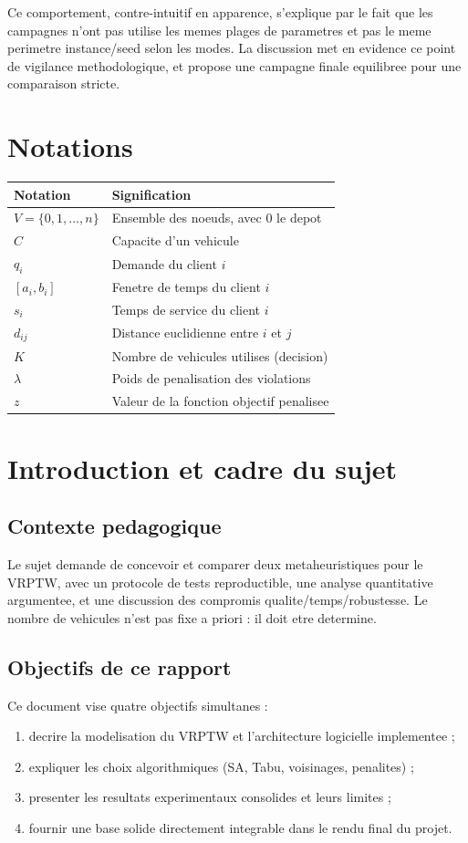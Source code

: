 \documentclass[12pt,a4paper]{report}
\begin{document}
Ce comportement, contre-intuitif en apparence, s'explique par le fait que
les campagnes n'ont pas utilise les memes plages de parametres et pas le meme perimetre
instance/seed selon les modes. La discussion met en evidence ce point de vigilance methodologique,
et propose une campagne finale equilibree pour une comparaison stricte.

\chapter*{Notations}
\begin{longtable}{p{3cm}p{11cm}}
\toprule
Notation & Signification \\
\midrule
$V=\{0,1,\dots,n\}$ & Ensemble des noeuds, avec $0$ le depot \\
$C$ & Capacite d'un vehicule \\
$q_i$ & Demande du client $i$ \\
$[a_i,b_i]$ & Fenetre de temps du client $i$ \\
$s_i$ & Temps de service du client $i$ \\
$d_{ij}$ & Distance euclidienne entre $i$ et $j$ \\
$K$ & Nombre de vehicules utilises (decision) \\
$\lambda$ & Poids de penalisation des violations \\
$z$ & Valeur de la fonction objectif penalisee \\
\bottomrule
\end{longtable}

\clearpage
{}

\chapter{Introduction et cadre du sujet}

\section{Contexte pedagogique}
Le sujet demande de concevoir et comparer deux metaheuristiques pour le VRPTW,
avec un protocole de tests reproductible, une analyse quantitative argumentee,
et une discussion des compromis qualite/temps/robustesse.
Le nombre de vehicules n'est pas fixe a priori : il doit etre determine.

\section{Objectifs de ce rapport}
Ce document vise quatre objectifs simultanes :
\begin{enumerate}
  \item decrire la modelisation du VRPTW et l'architecture logicielle implementee ;
  \item expliquer les choix algorithmiques (SA, Tabu, voisinages, penalites) ;
  \item presenter les resultats experimentaux consolides et leurs limites ;
  \item fournir une base solide directement integrable dans le rendu final du projet.
\end{enumerate}
\end{document}
